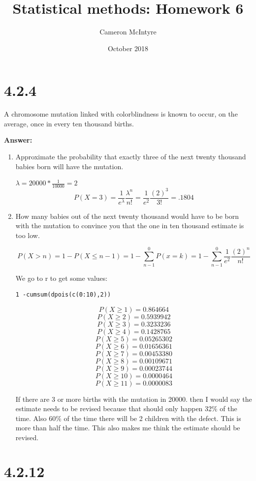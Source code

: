 \documentclass[svgnames]{article}
\title{Statistical methods: Homework 6}
\author{Cameron McIntyre}
\date{October 2018}
\begin{document}
\maketitle

\section{4.2.4}
A chromosome mutation linked with colorblindness is known to occur, on the average, once in every ten thousand births.

\textbf{Answer:}
\begin{enumerate}[label=(\alph*)]

\item Approximate the probability that exactly three of the next twenty thousand babies born will have the mutation.

$\lambda=20000*\frac{1}{10000}=2$
$$P(X=3)=\frac{1}{e^{\lambda}}\frac{\lambda^n}{n!}=\frac{1}{e^{2}}\frac{(2)^3}{3!}=.1804$$

\item  How many babies out of the next twenty thousand would have to be born with the mutation to convince you that the one in ten thousand estimate is too low.

$$P(X > n) = 1 - P(X \leq n-1) =1- \sum^{0}_{n-1}P(x=k) = 1- \sum^{0}_{n-1}\frac{1}{e^{2}}\frac{(2)^n}{n!}$$

We go to r to get some values:
\begin{lstlisting}
1 -cumsum(dpois(c(0:10),2))
\end{lstlisting}
$$ P(X\geq 1) =  0.864664 $$
$$ P(X\geq 2) =  0.5939942 $$
$$ P(X\geq 3) =  0.3233236 $$
$$ P(X\geq 4) =  0.1428765 $$
$$ P(X\geq 5) =  0.05265302 $$
$$ P(X\geq 6) =  0.01656361 $$
$$ P(X\geq 7) =  0.00453380 $$ 
$$ P(X\geq 8) =  0.00109671$$
$$ P(X\geq 9) =  0.00023744 $$
$$ P(X\geq 10) =  0.0000464 $$
$$ P(X\geq 11) =  0.0000083$$

If there are 3 or more births with the mutation in 20000. then I would say the estimate needs to be revised because that should only happen 32\% of the time. Also 60\% of the time there will be 2 children with the defect. This is more than half the time. This also makes me think the estimate should be revised. 
\end{enumerate}


\section{4.2.12}
\end{document}
